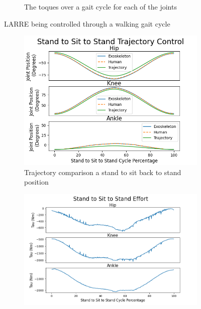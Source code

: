 \begin{figure}[h!]
\begin{subfigure}{0.5\textwidth}
        \caption{The toques over a gait cycle for each of the joints}
    \label{fig:simwalkingtorque}
\end{subfigure}
    \caption[LARRE Simulation Gait Kinematics]{LARRE being controlled through a walking gait cycle}
    \label{fig:simwalking}
\end{figure}
 
 
 
  \begin{figure}[h!]
    \begin{subfigure}{0.5\textwidth}
        \centering
        \includegraphics[width=\textwidth]{images/sim/standsitstandjoints (1).png}
        \caption{Trajectory comparison a stand to sit back to stand position}
        \label{fig:simsit2standTraj}
    \end{subfigure}
    \begin{subfigure}{0.5\textwidth}
        \centering
        \includegraphics[width=\textwidth]{images/sim/standsitstandtau.png}

\end{subfigure}
\end{figure}
